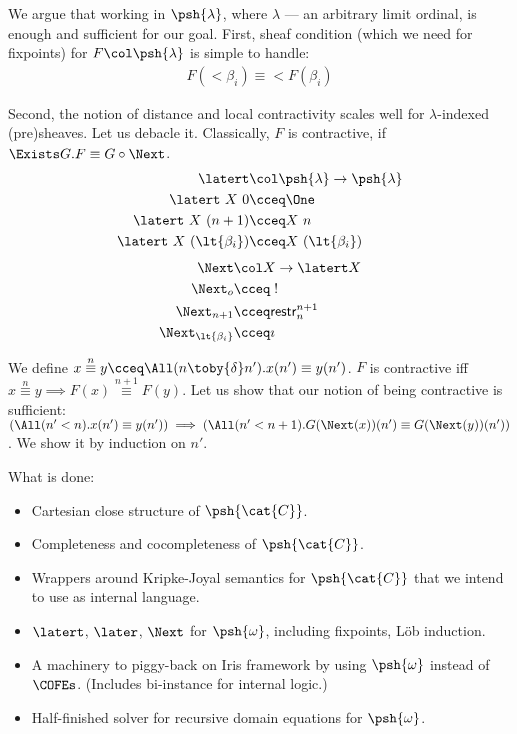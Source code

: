 We argue that working in $\psh{\lambda}$, where $\lambda$ --- an
arbitrary limit ordinal, is enough and sufficient for our goal. First,
sheaf condition (which we need for fixpoints) for $F \col
\psh{\lambda}$ is simple to handle:
\begin{align*} F(\lt{\beta_i}) \equiv \lt{F(\beta_i)}
\end{align*}

Second, the notion of distance and local contractivity scales well
for $\lambda$-indexed (pre)sheaves. Let us debacle it.
Classically, $F$ is contractive, if $\Exists G. F \equiv G \circ \Next$.
\begin{align*}
  \latert & \col \psh{\lambda} \rightarrow \psh{\lambda} \\
  \latert~X~0 & \cceq \One \\
  \latert~X~(n + 1) & \cceq X~n \\
  \latert~X~(\lt{\beta_i}) & \cceq X~(\lt{\beta_i})
\end{align*}
\begin{align*}
  \Next & \col X \rightarrow \latert X \\
  \Next_o & \cceq \; ! \\
  \Next_{n + 1} & \cceq \mathsf{restr}^{n + 1}_{n} \\
  \Next_{\lt{\beta_i}} & \cceq \imath
\end{align*}

We define $x \stackrel{n}{\equiv} y \cceq \All (n \toby{\delta} n'). x(n') \equiv y(n')$.
$F$ is contractive iff $x \stackrel{n}{\equiv} y \implies F(x) \stackrel{n + 1}{\equiv} F(y)$.
Let us show that our notion of being contractive is sufficient:
$(\All (n' < n). x(n') \equiv y(n')) \implies (\All (n' < n + 1). G(\Next(x))(n') \equiv G(\Next(y))(n'))$. We show it by induction on $n'$.

What is done:
\begin{itemize}
\item Cartesian close structure of $\psh{\cat{C}}$.
\item Completeness and cocompleteness of $\psh{\cat{C}}$.
\item Wrappers around Kripke-Joyal semantics for $\psh{\cat{C}}$ that
we intend to use as internal language.
\item $\latert$, $\later$, $\Next$ for $\psh{\omega}$, including
fixpoints, L\"ob induction.
\item A machinery to piggy-back on Iris framework by using
$\psh{\omega}$ instead of $\COFEs$. (Includes bi-instance for internal logic.)
\item Half-finished solver for recursive domain equations for
$\psh{\omega}$.
\end{itemize}

